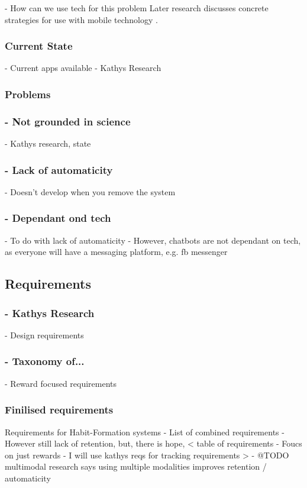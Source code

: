 - How can we use tech for this problem
Later research discusses concrete strategies for use with mobile technology \cite{article_beyond_self_tracking_designing_apps}.

  \subsubsection*{Current State}
      - Current apps available
      - Kathys Research

  \subsubsection*{Problems}
      \subsubsection*{- Not grounded in science}
        - Kathys research, state
      \subsubsection*{- Lack of automaticity}
        - Doesn't develop when you remove the system
      \subsubsection*{- Dependant ond tech}
        - To do with lack of automaticity
        - However, chatbots are not dependant on tech, as everyone will have a messaging platform, e.g. fb messenger

  \subsection{Requirements}
      \subsubsection*{- Kathys Research}
        - Design requirements
      \subsubsection*{- Taxonomy of...}
        - Reward focused requirements
      \subsubsection*{Finilised requirements}
      Requirements for Habit-Formation systems
      - List of combined requirements
      - However still lack of retention, but, there is hope,
      <
        table of requirements
        - Foucs on just rewards
        - I will use kathys reqs for tracking requirements
      >
      - @TODO multimodal research says using multiple modalities improves retention / automaticity

